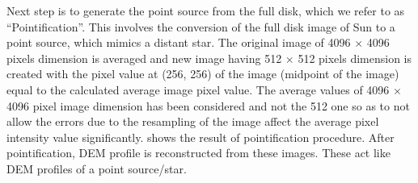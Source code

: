 \message{ !name(main.tex)}\documentclass[12pt]{article}
\begin{document}
Next step is to generate the point source from the full disk, which we refer to as ``Pointification''. This involves the conversion of the full disk image of Sun to a point source, which mimics a distant star. The original image of 4096 $\times$ 4096 pixels dimension is averaged and new image having 512 $\times$ 512 pixels dimension is created with the pixel value at (256, 256) of the image (midpoint of the image) equal to the calculated average image pixel value. The average values of 4096 $\times$ 4096 pixel image dimension has been considered and not the 512 one so as to not allow the errors due to the resampling of the image affect the average pixel intensity value significantly.  shows the result of pointification procedure. After pointification, DEM profile is reconstructed from these images. These act like DEM profiles of a point source/star.\\


\end{document}
